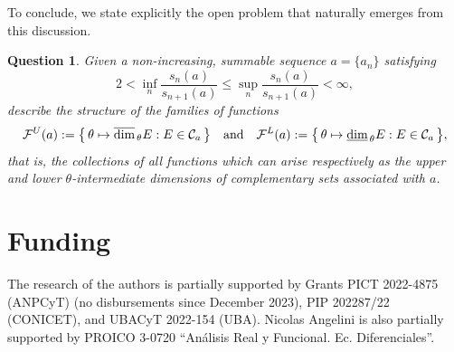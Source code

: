 \documentclass[11pt,reqno,bookmarksnumbered,raiselinks,breaklinks,colorlinks,plainpages]{amsart}
\newcommand\da{\underline{\mbox{\rm dim}}_{\,\theta}} %
\newcommand\uda{\overline{\mbox{\rm dim}}_{\,\theta}} %
\newtheorem{question}{Question}
\begin{document}
To conclude, we state explicitly the open problem that naturally emerges from this discussion.

\begin{question}
Given a non-increasing, summable sequence $a=\{a_n\}$ satisfying 
\[
2<\inf_n\frac{s_n(a)}{s_{n+1}(a)}\leq \sup_n\frac{s_n(a)}{s_{n+1}(a)}<\infty,
\]
describe the structure of the families of functions
\[
\mathcal{F}^U(a):=\bigl\{\,\theta\mapsto \uda E : E\in\mathcal{C}_a\,\bigr\}
\quad\text{and}\quad
\mathcal{F}^L(a):=\bigl\{\,\theta\mapsto \da E : E\in\mathcal{C}_a\,\bigr\},
\]
that is, the collections of all functions which can arise respectively as the upper and lower $\theta$-intermediate dimensions of complementary sets associated with $a$.
\end{question}

\section*{Funding}
The research of the authors is partially supported by Grants
PICT 2022-4875 (ANPCyT) (no disbursements since December 2023), 
PIP 202287/22 (CONICET), and 
UBACyT 2022-154 (UBA). Nicolas Angelini is also partially supported by PROICO 3-0720 ``An\'alisis Real y Funcional. Ec. Diferenciales''.
\end{document}
